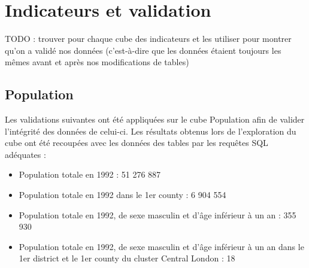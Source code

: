 \pagebreak

\chapter{Indicateurs et validation}

TODO : trouver pour chaque cube des indicateurs et les utiliser pour montrer qu'on a validé nos données (c'est-à-dire que les données étaient toujours les mêmes avant et après nos modifications de tables)

\section{Population}
Les validations suivantes ont été appliquées sur le cube Population afin de valider l'intégrité des données de celui-ci. Les résultats obtenus lors de l'exploration du cube ont été recoupées avec les données des tables par les requêtes SQL adéquates :
\begin{itemize}
    \item Population totale en 1992 : 51 276 887
    \item Population totale en 1992 dans le 1er county : 6 904 554
    \item Population totale en 1992, de sexe masculin et d'âge inférieur à un an : 355 930
    \item Population totale en 1992, de sexe masculin et d'âge inférieur à un an dans le 1er district et le 1er county du cluster Central London : 18
\end{itemize}


\pagebreak
